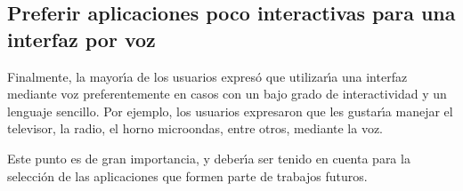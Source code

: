 \subsection{Preferir aplicaciones poco interactivas para una interfaz por voz}
Finalmente, la mayor{{\'\i}}a de los usuarios expres\'o que utilizar{{\'\i}}a una interfaz mediante voz
preferentemente en casos con un bajo grado de interactividad y un lenguaje sencillo.
Por ejemplo, los usuarios expresaron que les gustar{{\'\i}}a manejar el televisor, la radio, 
el horno microondas, entre otros, mediante la voz.

Este punto es de gran importancia, y deber{\'\i}a ser tenido en cuenta para la selecci\'on de las aplicaciones
que formen parte de trabajos futuros.

